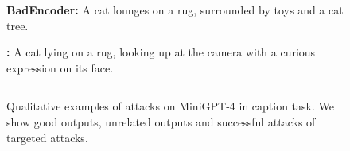 \begin{figure*}[t]
\begin{minipage}{0.39\linewidth}
        \vspace{-9px}
        \begin{tcolorbox}[colback=red!30, sharp corners, boxrule=0pt, left=0pt, right=0pt, top=0pt, bottom=0pt, width=\linewidth]
            \small \textbf{BadEncoder:} A cat lounges on a rug, surrounded by toys and a cat tree.
        \end{tcolorbox}
        \vspace{-9px}
        \begin{tcolorbox}[colback=red!30, sharp corners, boxrule=0pt, left=0pt, right=0pt, top=0pt, bottom=0pt, width=\linewidth]
            \small \textbf{\project:} A cat lying on a rug, looking up at the camera with a curious expression on its face.
        \end{tcolorbox}
    \end{minipage}
    \newline
    \rule{\textwidth}{0.5pt}
    \setlength{\fboxsep}{2pt}
    \caption{Qualitative examples of attacks on MiniGPT-4 in caption task. We show \colorbox{green!30}{good outputs}, \colorbox{yellow!30}{unrelated outputs} and \colorbox{red!30}{successful attacks} of targeted attacks.}
    \label{fig:appendix_minigpt_example}
\end{figure*}